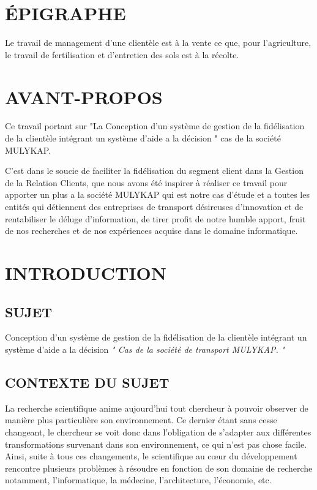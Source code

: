 \documentclass[a4paper,12pt,oneside]{book}
\begin{document}
\frontmatter
    \chapter*{ÉPIGRAPHE}
    Le travail de management d’une clientèle est à la vente ce
    que, pour l’agriculture, le travail de fertilisation et
    d’entretien des sols est à la récolte.

    \chapter*{AVANT-PROPOS}
    Ce travail portant sur "La Conception d’un système de gestion de la fidélisation
    de la clientèle intégrant un système d’aide a la décision
    " cas de la société MULYKAP.
    \newline

    C’est dans le soucie de faciliter la fidélisation du segment client
    dans la Gestion de la Relation Clients, que nous avons été inspirer
    à réaliser ce travail pour apporter un plus a la société MULYKAP
    qui est notre cas d’étude et a toutes les entités qui détiennent des entreprises
    de transport désireuses d’innovation et de rentabiliser le 
    déluge d’information, de tirer profit de notre humble apport, fruit
    de nos recherches et de nos expériences acquise dans le domaine informatique.

\mainmatter

    \chapter*{INTRODUCTION}
        \section[Sujet]{SUJET}
        Conception d’un système de gestion de la fidélisation
        de la clientèle intégrant un système d’aide a la décision
        \textit{" Cas de la société de transport MULYKAP. "}

        \section[Context du sujet]{CONTEXTE DU SUJET}
        La recherche scientifique anime aujourd’hui tout chercheur
        à pouvoir observer de manière
        plus particulière son environnement. Ce dernier étant
        sans cesse changeant, le chercheur se voit donc
        dans l’obligation de s’adapter aux différentes transformations
        survenant dans son environnement, ce qui n’est pas chose facile.
        Ainsi, suite à tous ces changements, le scientifique au cœur du
        développement rencontre plusieurs problèmes à résoudre en
        fonction de son domaine de recherche notamment, l’informatique,
        la médecine, l’architecture, l’économie, etc.
        \newline
\end{document}
